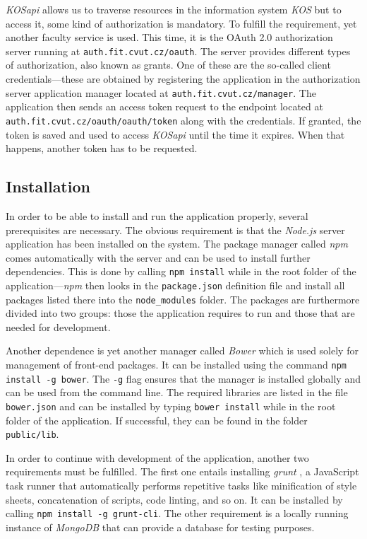 \documentclass[thesis=M,english,hidelinks]{FITthesis}[2012/10/20]
\newcommand{\code}{\texttt}
\begin{document}
\textit{KOSapi} allows us to traverse resources in the information system \textit{KOS} but to access it, some kind of authorization is mandatory. To fulfill the requirement, yet another faculty service is used. This time, it is the OAuth 2.0 authorization server running at \code{auth.fit.cvut.cz/oauth}. The server provides different types of authorization, also known as grants. One of these are the so-called client credentials---these are obtained by registering the application in the authorization server application manager located at \code{auth.fit.cvut.cz/manager}. The application then sends an access token request to the endpoint located at \code{auth.fit.cvut.cz/oauth/oauth/token} along with the credentials. If granted, the token is saved and used to access \textit{KOSapi} until the time it expires. When that happens, another token has to be requested.

    \subsection{Installation}

In order to be able to install and run the application properly, several prerequisites are necessary. The obvious requirement is that the \textit{Node.js} server application has been installed on the system. The package manager called \textit{npm} comes automatically with the server and can be used to install further dependencies. This is done by calling \code{npm install} while in the root folder of the application---\textit{npm} then looks in the \code{package.json} definition file and install all packages listed there into the \code{node\_modules} folder. The packages are furthermore divided into two groups: those the application requires to run and those that are needed for development.

Another dependence is yet another manager called \textit{Bower} \cite{bower} which is used solely for management of front-end packages. It can be installed using the command \code{npm install -g bower}. The \code{-g} flag ensures that the manager is installed globally and can be used from the command line. The required libraries are listed in the file \code{bower.json} and can be installed by typing \code{bower install} while in the root folder of the application. If successful, they can be found in the folder \code{public/lib}.

In order to continue with development of the application, another two requirements must be fulfilled. The first one entails installing \textit{grunt} \cite{grunt}, a JavaScript task runner that automatically performs repetitive tasks like minification of style sheets, concatenation of scripts, code linting, and so on. It can be installed by calling \code{npm install -g grunt-cli}. The other requirement is a locally running instance of \textit{MongoDB} that can provide a database for testing purposes.
\end{document}
